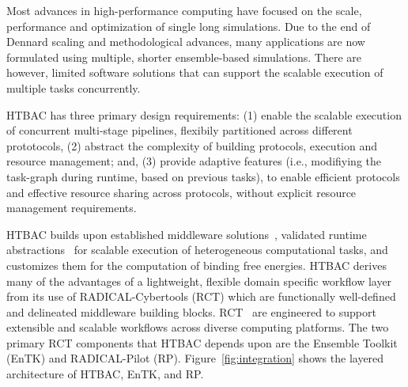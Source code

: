 
Most advances in high-performance computing have focused on the scale,
performance and optimization of single long simulations. Due to the end of
Dennard scaling and methodological advances, many applications are now
formulated using multiple, shorter ensemble-based simulations. There are
however, limited software solutions that can support the scalable execution of
multiple tasks concurrently.

HTBAC has three primary design requirements\@: (1) enable the scalable
execution of concurrent multi-stage pipelines, flexibily partitioned across
different prototocols, (2) abstract the complexity of building protocols,
execution and resource management; and, (3) provide adaptive features (i.e.,
modifiying the task-graph during runtime, based on previous tasks), to enable
efficient protocols and effective resource sharing across protocols, without
explicit resource management requirements.



HTBAC builds upon established middleware solutions~\cite{review_bb_2016},
validated runtime abstractions~\cite{turilli2017comprehensive} for scalable
execution of heterogeneous computational tasks, and customizes them for the
computation of binding free energies. HTBAC derives many of the advantages of
a lightweight, flexible domain specific workflow layer from its use of
RADICAL-Cybertools (RCT) which are functionally well-defined and delineated
middleware building blocks. RCT~\cite{review_bb_2016} are engineered to
support extensible and scalable workflows across diverse computing platforms.
The two primary RCT components that HTBAC depends upon are the Ensemble
Toolkit (EnTK) and RADICAL-Pilot (RP).  Figure~\ref{fig:integration} shows the
layered architecture of HTBAC, EnTK, and RP.

